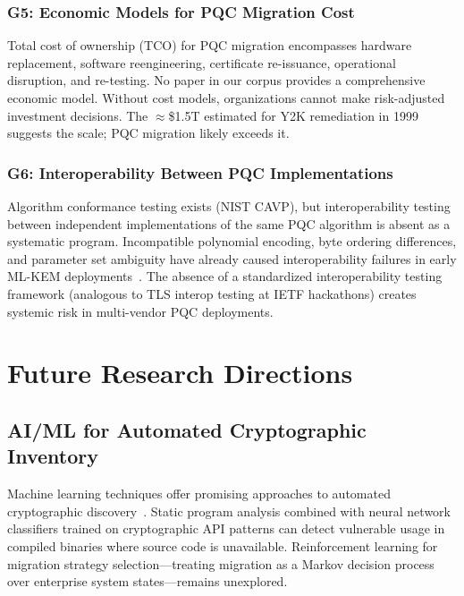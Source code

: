 \documentclass[journal]{IEEEtran}
\begin{document}
\subsubsection{G5: Economic Models for PQC Migration Cost}

Total cost of ownership (TCO) for PQC migration encompasses hardware
replacement, software reengineering, certificate re-issuance, operational
disruption, and re-testing. No paper in our corpus provides a comprehensive
economic model. Without cost models, organizations cannot make risk-adjusted
investment decisions. The $\approx$\$1.5T estimated for Y2K remediation
in 1999 suggests the scale; PQC migration likely exceeds it.

\subsubsection{G6: Interoperability Between PQC Implementations}

Algorithm conformance testing exists (NIST CAVP), but interoperability testing
between independent implementations of the same PQC algorithm is absent as a
systematic program. Incompatible polynomial encoding, byte ordering differences,
and parameter set ambiguity have already caused interoperability failures in
early ML-KEM deployments~\cite{oqs2024}. The absence of a standardized
interoperability testing framework (analogous to TLS interop testing at
IETF hackathons) creates systemic risk in multi-vendor PQC deployments.

\section{Future Research Directions}
\label{sec:future}

\subsection{AI/ML for Automated Cryptographic Inventory}

Machine learning techniques offer promising approaches to automated cryptographic
discovery~\cite{xiao2023machine,khalid2022ai}. Static program analysis combined
with neural network classifiers trained on cryptographic API patterns can detect
vulnerable usage in compiled binaries where source code is unavailable.
Reinforcement learning for migration strategy selection---treating migration as
a Markov decision process over enterprise system states---remains unexplored.
\end{document}
